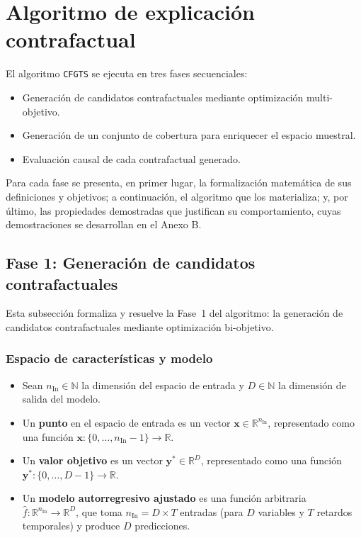 \documentclass[12pt]{report} %
\begin{document}
\section{Algoritmo de explicación contrafactual}

El algoritmo \texttt{CFGTS} se ejecuta en tres fases secuenciales:
\begin{itemize}
    \item Generación de candidatos contrafactuales mediante optimización multi-objetivo.
    \item Generación de un conjunto de cobertura para enriquecer el espacio muestral.
    \item Evaluación causal de cada contrafactual generado.
\end{itemize}
Para cada fase se presenta, en primer lugar, la formalización matemática de sus definiciones y objetivos; a continuación, el algoritmo que los materializa; y, por último, las propiedades demostradas que justifican su comportamiento, cuyas demostraciones se desarrollan en el Anexo B.

\subsection{Fase 1: Generación de candidatos contrafactuales}

Esta subsección formaliza y resuelve la Fase~1 del algoritmo: la generación de candidatos contrafactuales mediante optimización bi-objetivo.

\subsubsection{Espacio de características y modelo}

\begin{itemize}
    \item Sean $n_{\text{In}} \in \mathbb{N}$ la dimensión del espacio de entrada y $D \in \mathbb{N}$ la dimensión de salida del modelo.
    \item Un \textbf{punto} en el espacio de entrada es un vector $\mathbf{x} \in \mathbb{R}^{n_{\text{In}}}$, representado como una función $\mathbf{x}: \{0, \ldots, n_{\text{In}}-1\} \to \mathbb{R}$.
    \item Un \textbf{valor objetivo} es un vector $\mathbf{y}^* \in \mathbb{R}^D$, representado como una función $\mathbf{y}^*: \{0, \ldots, D-1\} \to \mathbb{R}$.
    \item Un \textbf{modelo autorregresivo ajustado} es una función arbitraria $\hat{f}: \mathbb{R}^{n_{\text{In}}} \to \mathbb{R}^D$, que toma $n_{\text{In}} = D \times T$ entradas (para $D$ variables y $T$ retardos temporales) y produce $D$ predicciones.
\end{itemize}
\end{document}
